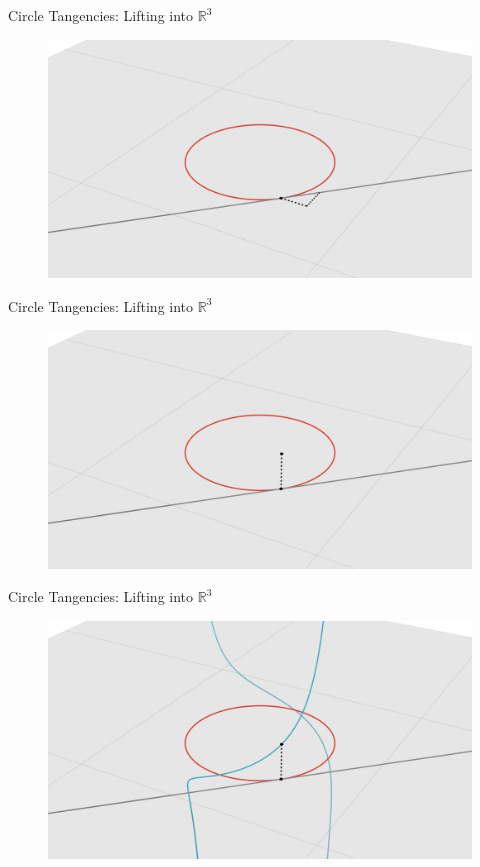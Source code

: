 \documentclass{beamer}
\newcommand{\RR}{\mathbb R}
\newcommand{\nfr}[1]{\begin{frame} #1
\end{frame}}
\begin{document}
\nfr{{Circle Tangencies: Lifting into $\RR^3$}

\begin{figure}[h]
    \centering
    \includegraphics[width=0.8
    \textwidth, trim={5cm 0 4cm 2cm}, clip=true]{images/Diagram3b.png}
\end{figure}

}
\nfr{{Circle Tangencies: Lifting into $\RR^3$}

\begin{figure}[h]
    \centering
    \includegraphics[width=0.8
    \textwidth, trim={5cm 0 4cm 2cm}, clip=true]{images/Diagram3c.png}
\end{figure}

}
\nfr{{Circle Tangencies: Lifting into $\RR^3$}

\begin{figure}[h]
    \centering
    \includegraphics[width=0.8
    \textwidth, trim={5cm 0 4cm 2cm}, clip=true]{images/Diagram3d.png}
\end{figure}

}
\end{document}
